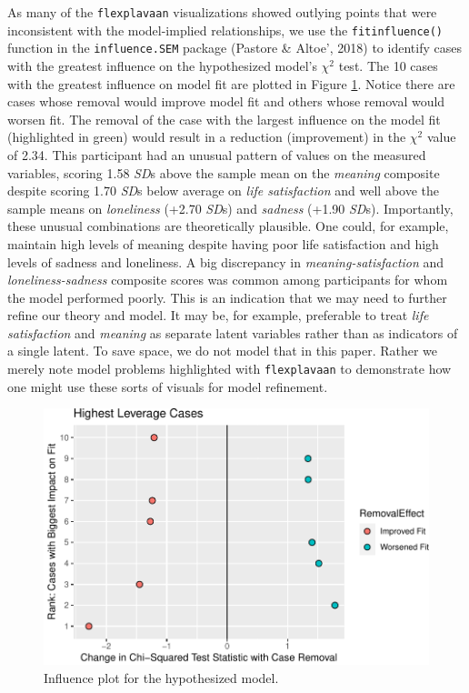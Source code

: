 \documentclass[
  english,
  man]{apa6}
\begin{document}
As many of the \texttt{flexplavaan} visualizations showed outlying points that were inconsistent with the model-implied relationships, we use the \texttt{fitinfluence()} function in the \texttt{influence.SEM} package (Pastore \& Altoe', 2018) to identify cases with the greatest influence on the hypothesized model's \(\chi^2\) test. The 10 cases with the greatest influence on model fit are plotted in Figure \ref{fig:influence}. Notice there are cases whose removal would improve model fit and others whose removal would worsen fit. The removal of the case with the largest influence on the model fit (highlighted in green) would result in a reduction (improvement) in the \(\chi^2\) value of 2.34. This participant had an unusual pattern of values on the measured variables, scoring 1.58 \emph{SD}s above the sample mean on the \emph{meaning} composite despite scoring 1.70 \emph{SD}s below average on \emph{life satisfaction} and well above the sample means on \emph{loneliness} (+2.70 \emph{SD}s) and \emph{sadness} (+1.90 \emph{SD}s). Importantly, these unusual combinations are theoretically plausible. One could, for example, maintain high levels of meaning despite having poor life satisfaction and high levels of sadness and loneliness. A big discrepancy in \emph{meaning-satisfaction} and \emph{loneliness-sadness} composite scores was common among participants for whom the model performed poorly. This is an indication that we may need to further refine our theory and model. It may be, for example, preferable to treat \emph{life satisfaction} and \emph{meaning} as separate latent variables rather than as indicators of a single latent. To save space, we do not model that in this paper. Rather we merely note model problems highlighted with \texttt{flexplavaan} to demonstrate how one might use these sorts of visuals for model refinement.

\begin{figure}

{\centering \includegraphics[width=0.6\linewidth]{flexplavaan_draft_files/figure-latex/influence-1} 

}

\caption{Influence plot for the hypothesized model.}\label{fig:influence}
\end{figure}
\end{document}
